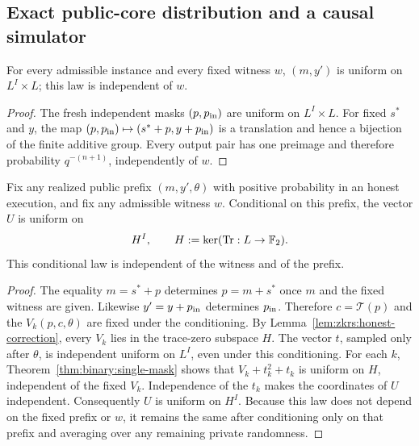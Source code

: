 \subsection{Exact public-core distribution and a causal simulator}\label{sec:zkrs:core}

\begin{lemma}\label{lem:zkrs:input-uniform}
For every admissible instance and every fixed witness $w$,
$(m,y')$ is uniform on $L^I\times L$; this law is independent of $w$.
\end{lemma}
\begin{proof}
The fresh independent masks $(p,p_{\rm in})$ are uniform
on $L^I\times L$. For fixed $s^*$ and $y$,
the map $(p,p_{\rm in})\mapsto(s^*+p,y+p_{\rm in})$
is a translation and hence a bijection of the finite additive
group. Every output pair has one preimage and therefore
probability $q^{-(n+1)}$, independently of $w$.
\end{proof}

\begin{lemma}\label{lem:zkrs:U-conditional}
Fix any realized public prefix $(m,y',\theta)$ with
positive probability in an honest execution, and fix any
admissible witness $w$. Conditional on this prefix, the vector
$U$ is uniform on
\[
 H^I,\qquad H:=\ker(\operatorname{Tr}:L\to\mathbb{F}_2).
\]
This conditional law is independent of the witness and of the prefix.
\end{lemma}
\begin{proof}
The equality $m=s^*+p$ determines $p=m+s^*$
once $m$ and the fixed witness are given. Likewise $y'=y+p_{\rm in}$
determines $p_{\rm in}$. Therefore $c=\mathcal T(p)$ and
the $V_k(p,c,\theta)$ are fixed under the conditioning.
By Lemma~\ref{lem:zkrs:honest-correction}, every $V_k$
lies in the trace-zero subspace $H$.
The vector $t$, sampled only after $\theta$, is independent
uniform on $L^I$, even under this conditioning.
For each $k$, Theorem~\ref{thm:binary:single-mask}
shows that $V_k+t_k^2+t_k$ is uniform on $H$,
independent of the fixed $V_k$.
Independence of the $t_k$ makes the coordinates of $U$
independent. Consequently $U$ is uniform on $H^I$.
Because this law does not depend on the fixed prefix or $w$,
it remains the same after conditioning only on that prefix
and averaging over any remaining private randomness.
\end{proof}


